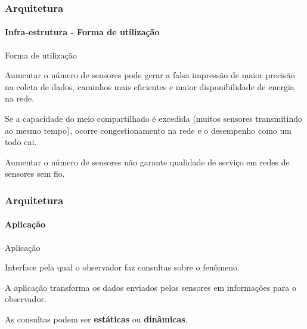\documentclass[notes]{beamer}
\begin{document}
\begin{frame}
\label{slide_38}
\frametitle{Arquitetura}
\framesubtitle{Infra-estrutura - Forma de utilização}

\begin{block}{Forma de utilização}

Aumentar o número de sensores pode gerar a falsa impressão de maior precisão na coleta de dados, caminhos mais eficientes e maior disponibilidade de energia na rede. 
\end{block} \pause

\begin{alertblock}

Se a capacidade do meio compartilhado é excedida (muitos sensores transmitindo ao mesmo tempo), ocorre congestionamento na rede e o desempenho como um todo cai.

\end{alertblock} \pause

\begin{alertblock}

Aumentar o número de sensores não garante qualidade de serviço em redes de sensores sem fio.

\end{alertblock}

\end{frame}

\begin{frame}
\label{slide_39}
\frametitle{Arquitetura}
\framesubtitle{Aplicação}

\begin{block}{Aplicação}

Interface pela qual o observador faz consultas sobre o fenômeno.

\end{block} \pause

\begin{block}

A aplicação transforma os dados enviados pelos sensores em informações para o observador.

\end{block} \pause

\begin{block}

As consultas podem ser \textbf{estáticas} ou \textbf{dinâmicas}. 

\end{block}

\end{frame}
\end{document}
